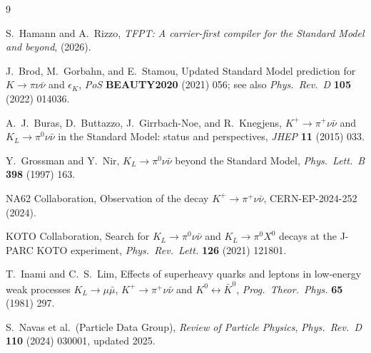 \begin{thebibliography}{9}

S.~Hamann and A.~Rizzo,
\textit{TFPT: A carrier-first compiler for the Standard Model and beyond},
(2026).

J.~Brod, M.~Gorbahn, and E.~Stamou,
Updated Standard Model prediction for $K\to\pi\nu\bar\nu$ and
$\epsilon_K$,
\textit{PoS} \textbf{BEAUTY2020} (2021) 056;
see also \textit{Phys.\ Rev.\ D} \textbf{105} (2022) 014036.

A.~J.~Buras, D.~Buttazzo, J.~Girrbach-Noe, and R.~Knegjens,
$K^+\to\pi^+\nu\bar\nu$ and $K_L\to\pi^0\nu\bar\nu$ in the Standard
Model: status and perspectives,
\textit{JHEP} \textbf{11} (2015) 033.

Y.~Grossman and Y.~Nir,
$K_L\to\pi^0\nu\bar\nu$ beyond the Standard Model,
\textit{Phys.\ Lett.\ B} \textbf{398} (1997) 163.

NA62 Collaboration,
Observation of the decay $K^+\to\pi^+\nu\bar\nu$,
CERN-EP-2024-252 (2024).

KOTO Collaboration,
Search for $K_L\to\pi^0\nu\bar\nu$ and
$K_L\to\pi^0 X^0$ decays at the J-PARC KOTO experiment,
\textit{Phys.\ Rev.\ Lett.} \textbf{126} (2021) 121801.

T.~Inami and C.~S.~Lim,
Effects of superheavy quarks and leptons in low-energy weak processes
$K_L\to\mu\bar\mu$, $K^+\to\pi^+\nu\bar\nu$ and $K^0\leftrightarrow\bar K^0$,
\textit{Prog.\ Theor.\ Phys.} \textbf{65} (1981) 297.

S.~Navas et al.\ (Particle Data Group),
\textit{Review of Particle Physics},
\textit{Phys.\ Rev.\ D} \textbf{110} (2024) 030001, updated 2025.

\end{thebibliography}


